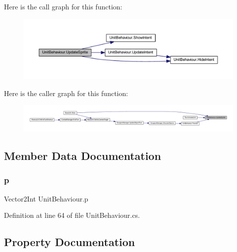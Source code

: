 Here is the call graph for this function\+:
\nopagebreak
\begin{figure}[H]
\begin{center}
\leavevmode
\includegraphics[width=350pt]{class_unit_behaviour_a559fdec9ef2c1c1a6c1a863cb868bce5_cgraph}
\end{center}
\end{figure}
Here is the caller graph for this function\+:
\nopagebreak
\begin{figure}[H]
\begin{center}
\leavevmode
\includegraphics[width=350pt]{class_unit_behaviour_a559fdec9ef2c1c1a6c1a863cb868bce5_icgraph}
\end{center}
\end{figure}


\subsection{Member Data Documentation}
\mbox{\label{class_unit_behaviour_ae1d622ff10d142433b35f6c2352b97e4}} 
\subsubsection{\texorpdfstring{p}{p}}
{\footnotesize\ttfamily Vector2\+Int Unit\+Behaviour.\+p}



Definition at line 64 of file Unit\+Behaviour.\+cs.



\subsection{Property Documentation}
\mbox{\label{class_unit_behaviour_a05cd74b1093c4a86d9a3556af9b3dad3}} 
